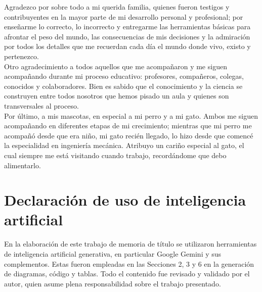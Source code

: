 \documentclass[
	spanish, %
	letterpaper, oneside
]{book}
\begin{document}
\templatePortrait

\templatePagecfg

\begin{abstractd}
	
\end{abstractd}

	

\begin{acknowledgments}
	Agradezco por sobre todo a mi querida familia, quienes fueron testigos y contribuyentes en la mayor parte de mi desarrollo personal y profesional; por enseñarme lo correcto, lo incorrecto y entregarme las herramientas básicas para afrontar el peso del mundo, las consecuencias de mis decisiones y la admiración por todos los detalles que me recuerdan cada día el mundo donde vivo, existo y pertenezco.\\

	Otro agradecimiento a todos aquellos que me acompañaron y me siguen acompañando durante mi proceso educativo: profesores, compañeros, colegas, conocidos y colaboradores. Bien es sabido que el conocimiento y la ciencia se construyen entre todos nosotros que hemos pisado un aula y quienes son transversales al proceso. \\

	Por último, a mis mascotas, en especial a mi perro y a mi gato. Ambos me siguen acompañando en diferentes etapas de mi crecimiento; mientras que mi perro me acompañó desde que era niño, mi gato recién llegado, lo hizo desde que comencé la especialidad en ingeniería mecánica. Atribuyo un cariño especial al gato, el cual siempre me está visitando cuando trabajo, recordándome que debo alimentarlo.
\end{acknowledgments}

\templateIndex

\clearpage
\section*{Declaración de uso de inteligencia artificial}

\par En la elaboración de este trabajo de memoria de título se utilizaron herramientas de inteligencia artificial generativa, en particular Google Gemini y sus complementos. Estas fueron empleadas en las Secciones 2, 3 y 6 en la generación de diagramas, código y tablas. Todo el contenido fue revisado y validado por el autor, quien asume plena responsabilidad sobre el trabajo presentado.

\templateFinalcfg











\end{document}
